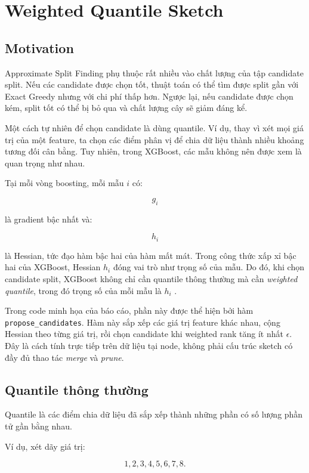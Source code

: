 \section{Weighted Quantile Sketch}

\subsection{Motivation}

Approximate Split Finding phụ thuộc rất nhiều vào chất lượng của tập candidate split. Nếu các candidate được chọn tốt, thuật toán có thể tìm được split gần với Exact Greedy nhưng với chi phí thấp hơn. Ngược lại, nếu candidate được chọn kém, split tốt có thể bị bỏ qua và chất lượng cây sẽ giảm đáng kể.

Một cách tự nhiên để chọn candidate là dùng quantile. Ví dụ, thay vì xét mọi giá trị của một feature, ta chọn các điểm phân vị để chia dữ liệu thành nhiều khoảng tương đối cân bằng. Tuy nhiên, trong XGBoost, các mẫu không nên được xem là quan trọng như nhau.

Tại mỗi vòng boosting, mỗi mẫu $i$ có:

\[
g_i
\]

là gradient bậc nhất và:

\[
h_i
\]

là Hessian, tức đạo hàm bậc hai của hàm mất mát. Trong công thức xấp xỉ bậc hai của XGBoost, Hessian $h_i$ đóng vai trò như trọng số của mẫu. Do đó, khi chọn candidate split, XGBoost không chỉ cần quantile thông thường mà cần \textit{weighted quantile}, trong đó trọng số của mỗi mẫu là $h_i$ \cite{chen2016xgboost}.

Trong code minh họa của báo cáo, phần này được thể hiện bởi hàm \texttt{propose\_candidates}. Hàm này sắp xếp các giá trị feature khác nhau, cộng Hessian theo từng giá trị, rồi chọn candidate khi weighted rank tăng ít nhất $\epsilon$. Đây là cách tính trực tiếp trên dữ liệu tại node, không phải cấu trúc sketch có đầy đủ thao tác \textit{merge} và \textit{prune}.

\subsection{Quantile thông thường}

Quantile là các điểm chia dữ liệu đã sắp xếp thành những phần có số lượng phần tử gần bằng nhau.

Ví dụ, xét dãy giá trị:

\[
1,2,3,4,5,6,7,8.
\]

